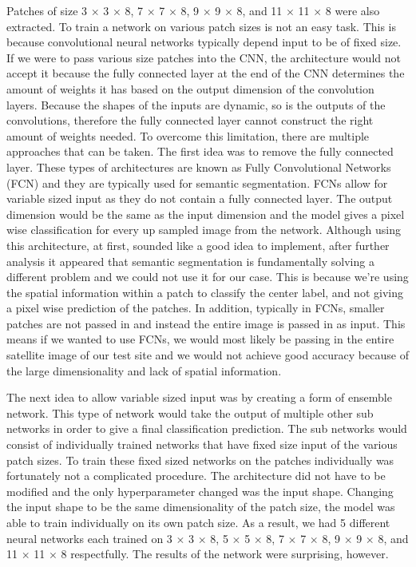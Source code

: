 \documentclass[letterpaper, 10 pt, conference]{ieeeconf}  %
\begin{document}
Patches of size 3 $\times$ 3 $\times$ 8, 7 $\times$ 7 $\times$ 8, 9 $\times$ 9 $\times$ 8, and 11 $\times$ 11 $\times$ 8 were also extracted. To train a network on various patch sizes is not an easy task. This is because convolutional neural networks typically depend input to be of fixed size. If we were to pass various size patches into the CNN, the architecture would not accept it because the fully connected layer at the end of the CNN determines the amount of weights it has based on the output dimension of the convolution layers. Because the shapes of the inputs are dynamic, so is the outputs of the convolutions, therefore the fully connected layer cannot construct the right amount of weights needed. To overcome this limitation, there are multiple approaches that can be taken. The first idea was to remove the fully connected layer. These types of architectures are known as Fully Convolutional Networks (FCN) and they are typically used for semantic segmentation. FCNs allow for variable sized input as they do not contain a fully connected layer. The output dimension would be the same as the input dimension and the model gives a pixel wise classification for every up sampled image from the network. Although using this architecture, at first, sounded like a good idea to implement, after further analysis it appeared that semantic segmentation is fundamentally solving a different problem and we could not use it for our case. This is because we’re using the spatial information within a patch to classify the center label, and not giving a pixel wise prediction of the patches. In addition, typically in FCNs, smaller patches are not passed in and instead the entire image is passed in as input. This means if we wanted to use FCNs, we would most likely be passing in the entire satellite image of our test site and we would not achieve good accuracy because of the large dimensionality and lack of spatial information. 

The next idea to allow variable sized input was by creating a form of ensemble network. This type of network would take the output of multiple other sub networks in order to give a final classification prediction. The sub networks would consist of individually trained networks that have fixed size input of the various patch sizes. To train these fixed sized networks on the patches individually was fortunately not a complicated procedure. The architecture did not have to be modified and the only hyperparameter changed was the input shape. Changing the input shape to be the same dimensionality of the patch size, the model was able to train individually on its own patch size. As a result, we had 5 different neural networks each trained on 3 $\times$ 3 $\times$ 8, 5 $\times$ 5 $\times$ 8, 7 $\times$ 7 $\times$ 8, 9 $\times$ 9 $\times$ 8, and 11 $\times$ 11 $\times$ 8 respectfully. The results of the network were surprising, however.
\end{document}
